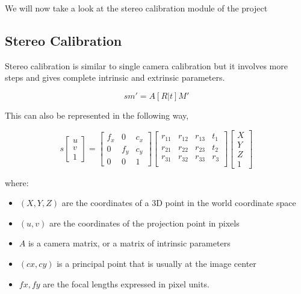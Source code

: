 \documentclass[11pt]{report}
\begin{document}
{{We will now take a look at the stereo calibration module of the project
\newpage
\subsection{Stereo Calibration}
Stereo calibration is similar to single camera calibration but it involves more steps and gives complete intrinsic and extrinsic parameters. 

\begin{equation}
sm' = A[R|t]M'
\end{equation}

This can also be represented in the following way,

\begin{equation}
s\begin{bmatrix}
u \\ v \\1
\end{bmatrix}
=\begin{bmatrix}
f_x & 0 & c_x\\
0 & f_y & c_y\\
0 & 0 & 1
\end{bmatrix}
\begin{bmatrix}
r_{11} & r_{12} & r_{13} & t_1\\
r_{21} & r_{22} & r_{23} & t_2\\
r_{31} & r_{32} & r_{33} & r_3\\

\end{bmatrix}
\begin{bmatrix}
X \\ Y \\ Z \\ 1
\end{bmatrix}
\end{equation}

where:
\begin{itemize}



  \item      $(X, Y, Z)$ are the coordinates of a 3D point in the world coordinate space
  \item      $(u, v)$ are the coordinates of the projection point in pixels
  \item      $A$ is a camera matrix, or a matrix of intrinsic parameters
  \item      $(cx, cy)$ is a principal point that is usually at the image center
  \item      $fx, fy$ are the focal lengths expressed in pixel units.


\end{itemize}}}
\end{document}
